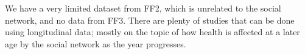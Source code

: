 



We have a very limited dataset from FF2, which is unrelated to the social network, and no data from FF3. There are plenty of studies that can be done using longitudinal data; mostly on the topic of how health is affected at a later age by the social network as the year progresses.



